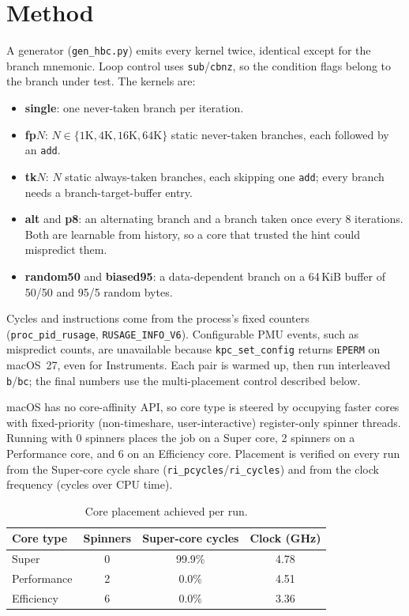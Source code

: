 \documentclass[10pt]{article}
\begin{document}
\section{Method}
A generator (\texttt{gen\_hbc.py}) emits every kernel twice, identical except for the
branch mnemonic. Loop control uses \texttt{sub}/\texttt{cbnz}, so the condition flags belong
to the branch under test. The kernels are:
\begin{itemize}
  \item \textbf{single}: one never-taken branch per iteration.
  \item \textbf{fp$N$}: $N \in \{1\mathrm{K}, 4\mathrm{K}, 16\mathrm{K}, 64\mathrm{K}\}$ static
        never-taken branches, each followed by an \texttt{add}.
  \item \textbf{tk$N$}: $N$ static always-taken branches, each skipping one \texttt{add};
        every branch needs a branch-target-buffer entry.
  \item \textbf{alt} and \textbf{p8}: an alternating branch and a branch taken once every
        8 iterations. Both are learnable from history, so a core that trusted the hint
        could mispredict them.
  \item \textbf{random50} and \textbf{biased95}: a data-dependent branch on a 64\,KiB
        buffer of 50/50 and 95/5 random bytes.
\end{itemize}

Cycles and instructions come from the process's fixed counters
(\texttt{proc\_pid\_rusage}, \texttt{RUSAGE\_INFO\_V6}). Configurable PMU events, such as
mispredict counts, are unavailable because \texttt{kpc\_set\_config} returns \texttt{EPERM}
on macOS~27, even for Instruments. Each pair is warmed up, then run interleaved
\texttt{b}/\texttt{bc}; the final numbers use the multi-placement control described below.

macOS has no core-affinity API, so core type is steered by occupying faster cores with
fixed-priority (non-timeshare, user-interactive) register-only spinner threads. Running
with 0 spinners places the job on a Super core, 2 spinners on a Performance core, and 6 on
an Efficiency core. Placement is verified on every run from the Super-core cycle share
(\texttt{ri\_pcycles}/\texttt{ri\_cycles}) and from the clock frequency (cycles over CPU
time).

\begin{table}[h]
\centering
\caption{Core placement achieved per run.}
\begin{tabular}{lccc}
\toprule
Core type & Spinners & Super-core cycles & Clock (GHz) \\
\midrule
Super       & 0 & 99.9\% & 4.78 \\
Performance & 2 & 0.0\%  & 4.51 \\
Efficiency  & 6 & 0.0\%  & 3.36 \\
\bottomrule
\end{tabular}
\end{table}
\end{document}
